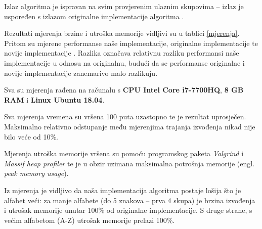 \documentclass[times, utf8, proizvoljni, numeric]{fer}
\begin{document}
Izlaz algoritma je ispravan na svim provjerenim ulaznim skupovima -- izlaz je uspoređen s izlazom originalne implementacije algoritma \citep{origimpl}.

Rezultati mjerenja brzine i utroška memorije vidljivi su u tablici \ref{mjerenja}. Pritom su mjerene performanse naše implementacije, originalne implementacije \citep{origimpl} te novije implementacije \citep{newimpl}. Razlika označava relativnu razliku performansi naše implementacije u odnosu na originalnu, budući da se performanse originalne i novije implementacije zanemarivo malo razlikuju.

Sva su mjerenja rađena na računalu s \textbf{CPU Intel Core i7-7700HQ}, \textbf{8 GB RAM} i \textbf{Linux Ubuntu 18.04}.

Sva mjerenja vremena su vršena 100 puta uzastopno te je rezultat uprosječen. Maksimalno relativno odstupanje među mjerenjima trajanja izvođenja nikad nije bilo veće od 10\%.

Mjerenja utroška memorije vršena su pomoću programskog paketa \textit{Valgrind} i \textit{Massif heap profiler} te je u obzir uzimana maksimalna potrošnja memorije (engl. \textit{peak memory usage}).

Iz mjerenja je vidljivo da naša implementacija algoritma postaje lošija što je alfabet veći: za manje alfabete (do 5 znakova -- prva 4 skupa) je brzina izvođenja i utrošak memorije unutar 100\% od originalne implementacije. S druge strane, s većim alfabetom (A-Z) utrošak memorije prelazi 100\%.

\pagebreak
\end{document}
